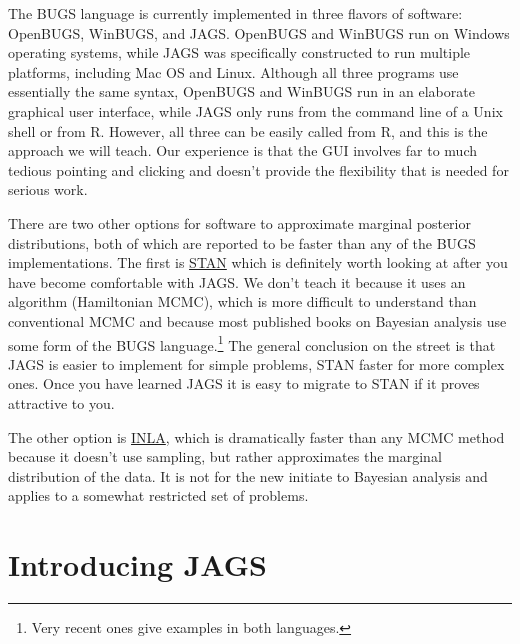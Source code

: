 \documentclass[12pt,english]{article}
\begin{document}
The BUGS language is currently implemented in three flavors of software: OpenBUGS, WinBUGS, and JAGS. OpenBUGS and WinBUGS run on Windows operating systems, while JAGS was specifically constructed to run multiple platforms, including Mac OS and Linux. Although all three programs use essentially the same syntax, OpenBUGS and WinBUGS run in an elaborate graphical user interface, while JAGS only runs from the command line of a Unix shell or from R. However, all three can be easily called from R, and this is the approach we will teach. Our experience is that the GUI involves far to much tedious pointing and clicking and doesn't provide the flexibility that is needed for serious work. 

There are two other options for software to approximate marginal posterior distributions, both of which are reported to be faster than any of the BUGS implementations. The first is \href{http://mc-stan.org/}{STAN} which is definitely worth looking at after you have become comfortable with JAGS. We don't teach it because it uses an algorithm (Hamiltonian MCMC), which is more difficult to understand than conventional MCMC and because most published books on Bayesian analysis use some form of the BUGS language.\footnote{Very recent ones give examples in both languages.} The general conclusion on the street is that JAGS is easier to implement for simple problems, STAN faster for more complex ones. Once you have learned JAGS it is easy to migrate to STAN if it proves attractive to you. 

The other option is \href{http://www.r-inla.org/}{INLA}, which is dramatically faster than any MCMC method because it doesn't use sampling, but rather approximates the marginal distribution of the data. It is not for the new initiate to Bayesian analysis and applies to a somewhat restricted set of problems.

\section{Introducing JAGS}
\end{document}
